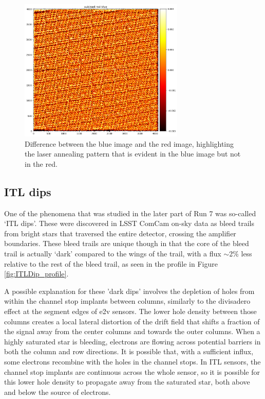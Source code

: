 \begin{figure}[ht]
\centering
\includegraphics[width=0.7\textwidth]{figures/subtract_red_blue.png}
\caption{Difference between the blue image and the red image, highlighting the laser annealing pattern that is evident in the blue image but not in the red.}
\label{fig:tree_ring_subtract_red_blue}
\end{figure}

\clearpage
\subsection{ITL dips}\label{itl-dips}

One of the phenomena that was studied in the later part of Run 7 was so-called
`ITL dips'. These were discovered in LSST ComCam on-sky data as
bleed trails from bright stars that traversed the entire detector,
crossing the amplifier boundaries. These bleed trails are unique
though in that the core of the bleed trail is actually `dark'
compared to the wings of the trail, with a flux $\sim$2\% less relative to the rest of the
bleed trail, as seen in the profile in Figure \ref{fig:ITLDip_profile}.

A possible explanation for these 'dark dips' involves the depletion of
holes from within the channel stop implants between columns, similarly to the
divisadero effect at the segment edges of e2v sensors. The lower hole density
between those columns creates a local lateral distortion of the drift field that shifts a fraction of the signal away from the center columns and towards the outer columns.
When a highly saturated star is bleeding, electrons are flowing across potential barriers in both the column and row directions. It is possible that, with a sufficient influx, some electrons recombine with the holes in the channel stops.
In ITL sensors, the channel stop implants are continuous across the whole sensor, so it is possible for this lower hole density to propagate away from the saturated star, both above and below the source of electrons.

